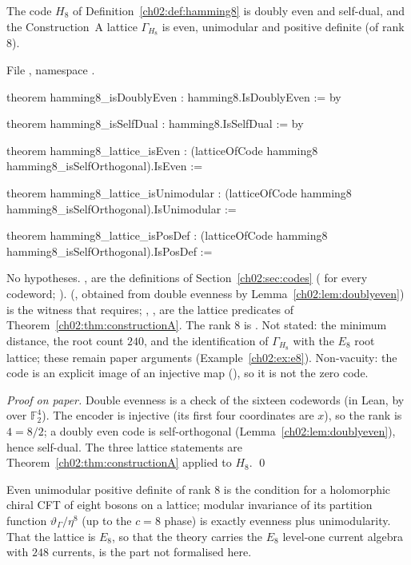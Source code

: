\begin{theorem}\label{ch02:thm:hamming8}
The code $H_8$ of Definition~\ref{ch02:def:hamming8} is doubly even and self-dual, and the Construction~A lattice $\Gamma_{H_8}$
is even, unimodular and positive definite (of rank $8$).
\end{theorem}
\noindent File , namespace .
\begin{leancode}
theorem hamming8_isDoublyEven : hamming8.IsDoublyEven := by

theorem hamming8_isSelfDual : hamming8.IsSelfDual := by

theorem hamming8_lattice_isEven :
    (latticeOfCode hamming8 hamming8_isSelfOrthogonal).IsEven :=

theorem hamming8_lattice_isUnimodular :
    (latticeOfCode hamming8 hamming8_isSelfOrthogonal).IsUnimodular :=

theorem hamming8_lattice_isPosDef :
    (latticeOfCode hamming8 hamming8_isSelfOrthogonal).IsPosDef :=
\end{leancode}
\begin{dictionary}
No hypotheses. ,  are the definitions of Section~\ref{ch02:sec:codes}
( for every codeword; ). 
(, obtained from double evenness by Lemma~\ref{ch02:lem:doublyeven}) is the witness that
 requires; , ,  are the lattice predicates of
Theorem~\ref{ch02:thm:constructionA}. The rank $8$ is . Not stated: the minimum distance, the
root count $240$, and the identification of $\Gamma_{H_8}$ with the $E_8$ root lattice; these remain paper arguments
(Example~\ref{ch02:ex:e8}). Non-vacuity: the code is an explicit image of an injective map (),
so it is not the zero code.
\end{dictionary}
\emph{Proof on paper.}  Double evenness is a check of the sixteen codewords (in Lean, by  over
$\mathbb F_2^4$). The encoder is injective (its first four coordinates are $x$), so the rank is $4=8/2$; a doubly even code is
self-orthogonal (Lemma~\ref{ch02:lem:doublyeven}), hence self-dual. The three lattice statements are
Theorem~\ref{ch02:thm:constructionA} applied to $H_8$.  \qed
\begin{physics}
Even unimodular positive definite of rank $8$ is the condition for a holomorphic chiral CFT of eight bosons on a lattice;
modular invariance of its partition function $\vartheta_{\Gamma}/\eta^8$ (up to the $c=8$ phase) is exactly evenness plus
unimodularity. That the lattice is $E_8$, so that the theory carries the $E_8$ level-one current algebra with $248$ currents, is
the part not formalised here.
\end{physics}
